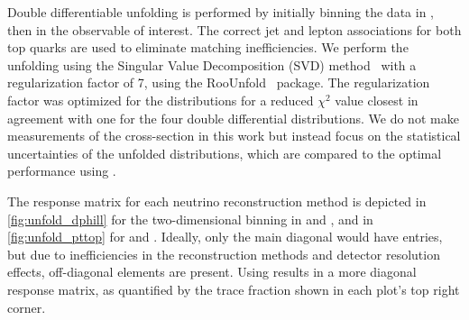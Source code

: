 Double differentiable unfolding is performed by initially binning the data in \mttbar, then in the observable of interest.
The correct jet and lepton associations for both top quarks are used to eliminate matching inefficiencies.
We perform the unfolding using the Singular Value Decomposition (SVD) method~\cite{SVDApproachData} with a regularization factor of 7, using the RooUnfold~\cite{ComparisonUnfoldingMethods} package.
The regularization factor was optimized for the \vtruth distributions for a reduced $\chi^2$ value closest in agreement with one for the four double differential distributions.
We do not make measurements of the cross-section in this work but instead focus on the statistical uncertainties of the unfolded distributions, which are compared to the optimal performance using \vtruth.

\begin{table}[htbp]
    \centering
    \caption{Kinematic observables of the reconstructed \ttbar system studied for an unfolding analysis in dilepton events and their bin edges.}
    \label{tab:diff_observables}
\end{table}

The response matrix for each neutrino reconstruction method is depicted in \cref{fig:unfold_dphill} for the two-dimensional binning in \mttbar and \dphill, and in \cref{fig:unfold_pttop} for \mttbar and \pttop.
Ideally, only the main diagonal would have entries, but due to inefficiencies in the reconstruction methods and detector resolution effects, off-diagonal elements are present.
Using \vvflows results in a more diagonal response matrix, as quantified by the trace fraction shown in each plot's top right corner.


